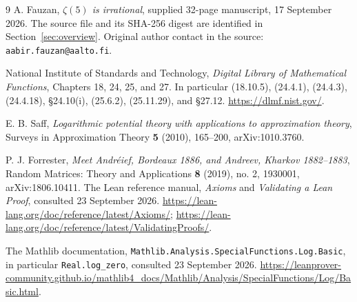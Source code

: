 \begin{thebibliography}{9}
A. Fauzan, \emph{$\zeta(5)$ is irrational}, supplied 32-page manuscript,
17 September 2026. The source file and its SHA-256 digest are identified
in Section~\ref{sec:overview}. Original author contact in the source:
\texttt{aabir.fauzan@aalto.fi}.

National Institute of Standards and Technology,
\emph{Digital Library of Mathematical Functions}, Chapters 18, 24, 25,
and 27. In particular (18.10.5), (24.4.1), (24.4.3), (24.4.18),
\S24.10(i), (25.6.2), (25.11.29), and \S27.12.
\url{https://dlmf.nist.gov/}.

E. B. Saff, \emph{Logarithmic potential theory with applications to
approximation theory}, Surveys in Approximation Theory \textbf{5}
(2010), 165--200, arXiv:1010.3760.

P. J. Forrester, \emph{Meet Andr\'eief, Bordeaux 1886, and Andreev,
Kharkov 1882--1883}, Random Matrices: Theory and Applications
\textbf{8} (2019), no. 2, 1930001, arXiv:1806.10411.
The Lean reference manual, \emph{Axioms} and \emph{Validating a Lean Proof},
consulted 23 September 2026.
\url{https://lean-lang.org/doc/reference/latest/Axioms/};
\url{https://lean-lang.org/doc/reference/latest/ValidatingProofs/}.

The Mathlib documentation, \texttt{Mathlib.Analysis.SpecialFunctions.Log.Basic},
in particular \texttt{Real.log\_zero}, consulted 23 September 2026.
\url{https://leanprover-community.github.io/mathlib4_docs/Mathlib/Analysis/SpecialFunctions/Log/Basic.html}.
\end{thebibliography}

